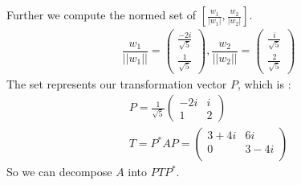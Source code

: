Further we compute the normed set of $\left[ \frac{w_1}{|w_1|}, \frac{w_2}{|w_2|} \right]$.
\begin{gather*}
\dfrac{w_1}{||w_1||} = \left( \begin{array}{c}
\frac{-2i}{\sqrt{5}} \\
\frac{1}{\sqrt{5}}
\end{array} \right)
, \dfrac{w_2}{||w_2||} = \left( \begin{array}{c}
\frac{i}{\sqrt{5}}\\
\frac{2}{\sqrt{5}}
\end{array} \right)
\end{gather*}
The set represents our transformation vector $P$, which is :
\begin{gather*}
P = \frac{1}{\sqrt{5}}\left( \begin{array}{cc}
-2i & i\\
1 & 2
\end{array} \right) \\
T = P^{*} A P =  \left( \begin{array}{cc}
3+4i & 6i\\
0 & 3-4i \\
\end{array} \right)
\end{gather*}
So we can decompose $A$ into $PTP^{*}$.

